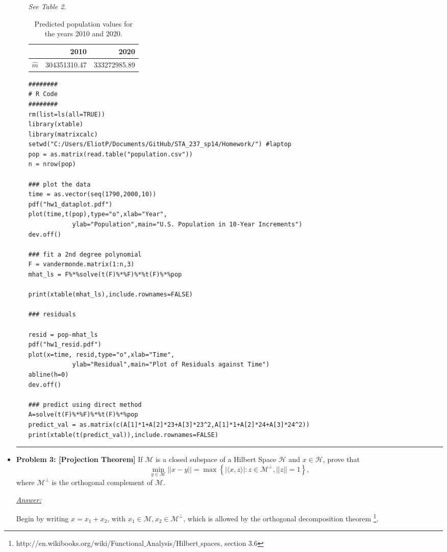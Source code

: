 \documentclass[a4paper, 11pt]{article}
\begin{document}
\begin{itemize}
\begin{enumerate}[(a)]
		\emph{See Table 2.}
		
		\begin{table}[h!]
		\centering
		\begin{tabular}{rrr}
			\hline
			& 2010 & 2020 \\ 
			\hline
		$\widehat{m}$ & 304351310.47 & 333272985.89 \\ 
			\hline
		\end{tabular}
		\caption{Predicted population values for the years 2010 and 2020.}
		\end{table}

\begin{verbatim}
########
# R Code
########
rm(list=ls(all=TRUE))
library(xtable)
library(matrixcalc)
setwd("C:/Users/EliotP/Documents/GitHub/STA_237_sp14/Homework/") #laptop
pop = as.matrix(read.table("population.csv"))
n = nrow(pop)

### plot the data
time = as.vector(seq(1790,2000,10))
pdf("hw1_dataplot.pdf")
plot(time,t(pop),type="o",xlab="Year",
			ylab="Population",main="U.S. Population in 10-Year Increments")
dev.off()

### fit a 2nd degree polynomial
F = vandermonde.matrix(1:n,3)
mhat_ls = F%*%solve(t(F)%*%F)%*%t(F)%*%pop 

print(xtable(mhat_ls),include.rownames=FALSE)

### residuals

resid = pop-mhat_ls
pdf("hw1_resid.pdf")
plot(x=time, resid,type="o",xlab="Time",
			ylab="Residual",main="Plot of Residuals against Time")
abline(h=0)
dev.off()

### predict using direct method
A=solve(t(F)%*%F)%*%t(F)%*%pop
predict_val = as.matrix(c(A[1]*1+A[2]*23+A[3]*23^2,A[1]*1+A[2]*24+A[3]*24^2))
print(xtable(t(predict_val)),include.rownames=FALSE)
\end{verbatim}
\end{enumerate}
	

	\hrule 
	\newpage \newpage 
	\item \textbf{Problem 3: [Projection Theorem]} If $\mathcal{M}$ is a closed subspace of a Hilbert Space $\mathcal{H}$ and $x\in\mathcal{H}$, prove that 
	$$\underset{y\in\mathcal{M}}{\min}||x-y|| = \max\left\{|\langle x,z\rangle|: z\in \mathcal{M}^\bot, ||z|| = 1  \right\} ,$$
where $\mathcal{M}^\bot$ is the orthogonal complement of $\mathcal{M}$. \newline 

	\underline{\emph{Answer:}}
	
Begin by writing $x = x_1 + x_2$, with $x_1 \in \mathcal{M}, x_2\in\mathcal{M}^\bot$, which is allowed by the orthogonal decomposition theorem \footnote{http://en.wikibooks.org/wiki/Functional$\_$Analysis/Hilbert$\_$spaces, section 3.6}.


\end{itemize}
\end{document}
